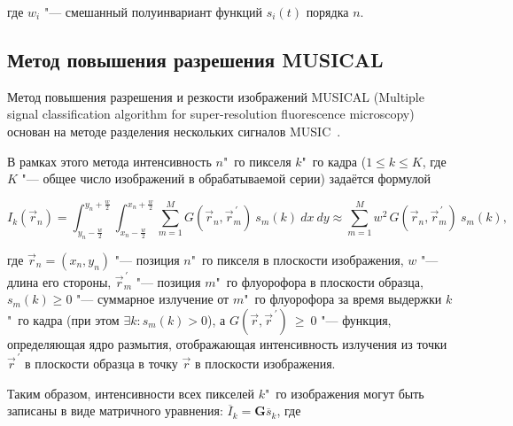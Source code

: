 \noindent где $w_i$ "--- смешанный полуинвариант функций $s_i(t)$ порядка $n$.

\subsection{Метод повышения разрешения MUSICAL}

Метод повышения разрешения и резкости изображений MUSICAL (Multiple signal classification algorithm for super-resolution fluorescence microscopy)~\cite{agarwal2016multiple} основан на методе разделения нескольких сигналов MUSIC~\cite{schmidt1986multiple}.

В рамках этого метода интенсивность $n$"~го пикселя $k$"~го кадра ($1\le k\le K$, где $K$ "--- общее число изображений в обрабатываемой серии) задаётся формулой

\begin{equation}
	I_k\left({\vec{r}}_n\right)=\int_{y_n-\frac{w}{2}}^{y_n+\frac{w}{2}}\int_{x_n-\frac{w}{2}}^{x_n+\frac{w}{2}}\sum_{m=1}^{M}{G\left({\vec{r}}_n,{\vec{r}}_m^{\,\prime}\right)\ s_m\left(k\right)\ dx\ dy}\approx\sum_{m=1}^{M}{w^{2\ }G\left({\vec{r}}_n,{\vec{r}}_m^{\,\prime}\right){\ s}_m\left(k\right)}, \nonumber
\end{equation}	

\noindent где ${\vec{r}}_n=(x_n,y_n)$ "--- позиция $n$"~го пикселя в плоскости изображения, $w$ "--- длина его стороны, ${\vec{r}}_m^{\,\prime}$ "--- позиция $m$"~го флуорофора в плоскости образца, $s_m\left(k\right)\geq0$ "--- суммарное излучение от $m$"~го флуорофора за время выдержки $k$"~го кадра (при этом $\exists k: {s}_m\left(k\right)>0$), а $G\left(\vec{r},{\vec{r}}^{\,\prime}\right)\ \geq\ 0$ "--- функция, определяющая ядро размытия, отображающая интенсивность излучения из точки ${\vec{r}}^{\,\prime}$ в плоскости образца в точку $\vec{r}$ в плоскости изображения.

Таким образом, интенсивности всех пикселей $k$"~го изображения могут быть записаны в виде матричного уравнения: ${\overline{I}}_k=\mathbf{G}{\overline{s}}_k$, где

